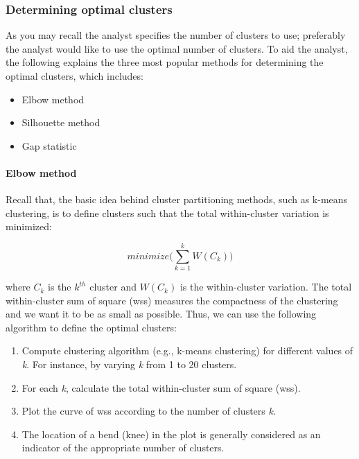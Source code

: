 \documentclass[]{book}
\providecommand{\tightlist}{%
  \setlength{\itemsep}{0pt}\setlength{\parskip}{0pt}}
\let\oldparagraph\paragraph
\renewcommand{\paragraph}[1]{\oldparagraph{#1}\mbox{}}
\theoremstyle{definition}
\theoremstyle{definition}
\theoremstyle{definition}
\theoremstyle{remark}
\begin{document}
\hypertarget{determining-optimal-clusters}{%
\subsubsection{Determining optimal
clusters}\label{determining-optimal-clusters}}

As you may recall the analyst specifies the number of clusters to use;
preferably the analyst would like to use the optimal number of clusters.
To aid the analyst, the following explains the three most popular
methods for determining the optimal clusters, which includes:

\begin{itemize}
\tightlist
\item
  Elbow method
\item
  Silhouette method
\item
  Gap statistic
\end{itemize}

\hypertarget{elbow}{%
\paragraph{Elbow method}\label{elbow}}

Recall that, the basic idea behind cluster partitioning methods, such as
k-means clustering, is to define clusters such that the total
within-cluster variation is minimized:

\[ minimize\Bigg(\sum^k_{k=1}W(C_k)\Bigg) \tag{8}\]

where \(C_k\) is the \(k^{th}\) cluster and \(W(C_k)\) is the
within-cluster variation. The total within-cluster sum of square (wss)
measures the compactness of the clustering and we want it to be as small
as possible. Thus, we can use the following algorithm to define the
optimal clusters:

\begin{enumerate}
\def\labelenumi{\arabic{enumi}.}
\tightlist
\item
  Compute clustering algorithm (e.g., k-means clustering) for different
  values of \emph{k}. For instance, by varying \emph{k} from 1 to 20
  clusters.
\item
  For each \emph{k}, calculate the total within-cluster sum of square
  (wss).
\item
  Plot the curve of wss according to the number of clusters \emph{k}.
\item
  The location of a bend (knee) in the plot is generally considered as
  an indicator of the appropriate number of clusters.
\end{enumerate}
\end{document}
